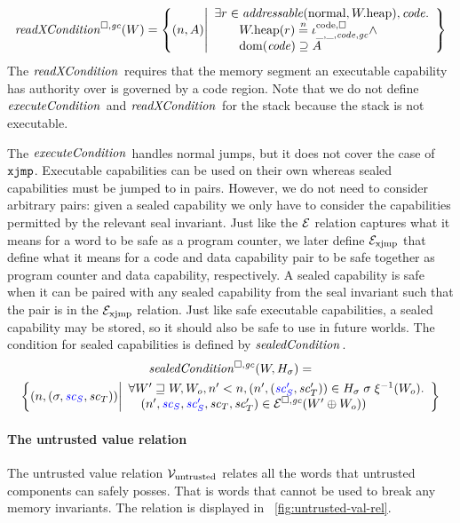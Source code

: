 \begin{jversion}
\[
  \xReadCond{W} = \left\{ \npair{A} \middle| 
    \begin{array}{l}
      \exists r \in \addressable{\normal, \pwheap}, \code \ldotp \\
      \qquad \pwheap(r) \nequal \codereg{\_,\_,\code,\gc}\wedge\\
      \qquad \dom(\code) \supseteq A 
    \end{array}
  \right\}
\]
The $\xReadCond[]{}$ requires that the memory segment an executable capability has authority over is governed by a code region.
Note that we do not define $\execCond[]{}$ and $\xReadCond[]{}$ for the stack because the stack is not executable.

The $\execCond[]{}$ handles normal jumps, but it does not cover the case of $\txjmp{}{}$.
Executable capabilities can be used on their own whereas sealed capabilities must be jumped to in pairs.
However, we do not need to consider arbitrary pairs: given a sealed capability we only have to consider the capabilities permitted by the relevant seal invariant.
Just like the $\mathcal{E}$ relation captures what it means for a word to be safe as a program counter, we later define $\mathcal{E}_{\mathrm{xjmp}}$ that define what it means for a code and data capability pair to be safe together as program counter and data capability, respectively.
A sealed capability is safe when it can be paired with any sealed capability from the seal invariant such that the pair is in the $\mathcal{E}_{\mathrm{xjmp}}$ relation.
Just like safe executable capabilities, a sealed capability may be stored, so it should also be safe to use in future worlds.
The condition for sealed capabilities is defined by $\sealedCond[]{}$.
\begin{multline*}
\sealedCond{W,H_\sigma} =\\
\left\{\npair{(\sigma, \src{\vsc_S},\vsc_T)}\middle|
  \begin{array}{l}
  \forall W' \future W, W_o, n' < n, \npair[n']{\stpair[.]{\vsc_S'}{\vsc'_T}} \in H_\sigma \; \sigma \; \xi^{-1}(W_o) \ldotp\\
    \quad \npair[n']{\src{\vsc_S},\src{\vsc_S'},\vsc_T,\vsc_T'} \in \lrexj(W'\oplus W_o))
  \end{array}
\right\}
\end{multline*}

\paragraph{The untrusted value relation}
\label{par:untrusted-val-rel}
The untrusted value relation $\mathcal{V}_{\mathrm{untrusted}}$ relates all the words that untrusted components can safely posses.
That is words that cannot be used to break any memory invariants.
The relation is displayed in \figurename~\ref{fig:untrusted-val-rel}.


\end{jversion}
